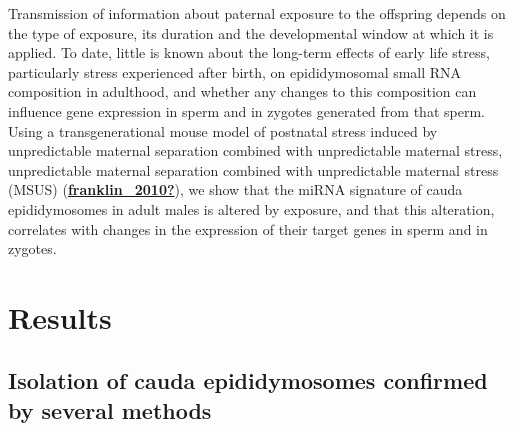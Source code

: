 \documentclass[12pt,twoside]{reedthesis}
\begin{document}
Transmission of information about paternal exposure to the offspring
depends on the type of exposure, its duration and the developmental
window at which it is applied. To date, little is known about the
long-term effects of early life stress, particularly stress experienced
after birth, on epididymosomal small RNA composition in adulthood, and
whether any changes to this composition can influence gene expression in
sperm and in zygotes generated from that sperm. Using a
transgenerational mouse model of postnatal stress induced by
unpredictable maternal separation combined with unpredictable maternal
stress, unpredictable maternal separation combined with unpredictable
maternal stress (MSUS) (\protect\hyperlink{ref-franklin_2010}{\textbf{franklin\_2010?}}), we show that the miRNA
signature of cauda epididymosomes in adult males is altered by exposure,
and that this alteration, correlates with changes in the expression of
their target genes in sperm and in zygotes.

\newpage

\hypertarget{results-1}{%
\section{Results}\label{results-1}}

\hypertarget{isolation-of-cauda-epididymosomes-confirmed-by-several-methods}{%
\subsection{Isolation of cauda epididymosomes confirmed by several methods}\label{isolation-of-cauda-epididymosomes-confirmed-by-several-methods}}
\end{document}

